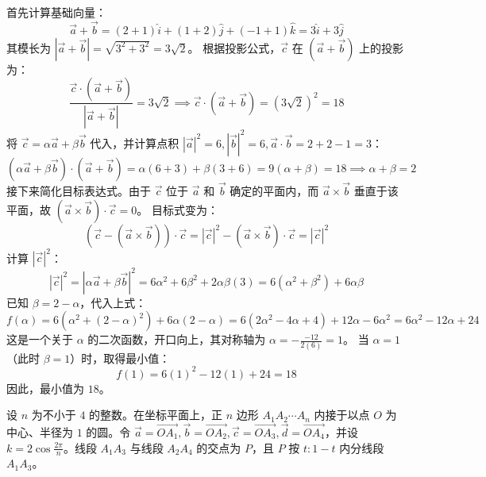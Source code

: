 \begin{questions}
\begin{solution}
首先计算基础向量：
\[
\vec{a} + \vec{b} = (2+1)\hat{i} + (1+2)\hat{j} + (-1+1)\hat{k} = 3\hat{i} + 3\hat{j}
\]
其模长为 $|\vec{a} + \vec{b}| = \sqrt{3^2 + 3^2} = 3\sqrt{2}$。
根据投影公式，$\vec{c}$ 在 $(\vec{a} + \vec{b})$ 上的投影为：
\[
\frac{\vec{c} \cdot (\vec{a} + \vec{b})}{|\vec{a} + \vec{b}|} = 3\sqrt{2} \implies \vec{c} \cdot (\vec{a} + \vec{b}) = (3\sqrt{2})^2 = 18
\]
将 $\vec{c} = \alpha\vec{a} + \beta\vec{b}$ 代入，并计算点积 $|\vec{a}|^2 = 6, |\vec{b}|^2 = 6, \vec{a} \cdot \vec{b} = 2+2-1 = 3$：
\[
(\alpha\vec{a} + \beta\vec{b}) \cdot (\vec{a} + \vec{b}) = \alpha(6+3) + \beta(3+6) = 9(\alpha + \beta) = 18 \implies \alpha + \beta = 2
\]
接下来简化目标表达式。由于 $\vec{c}$ 位于 $\vec{a}$ 和 $\vec{b}$ 确定的平面内，而 $\vec{a} \times \vec{b}$ 垂直于该平面，故 $(\vec{a} \times \vec{b}) \cdot \vec{c} = 0$。
目标式变为：
\[
(\vec{c} - (\vec{a} \times \vec{b})) \cdot \vec{c} = |\vec{c}|^2 - (\vec{a} \times \vec{b}) \cdot \vec{c} = |\vec{c}|^2
\]
计算 $|\vec{c}|^2$：
\[
|\vec{c}|^2 = |\alpha\vec{a} + \beta\vec{b}|^2 = 6\alpha^2 + 6\beta^2 + 2\alpha\beta(3) = 6(\alpha^2 + \beta^2) + 6\alpha\beta
\]
已知 $\beta = 2 - \alpha$，代入上式：
\[
f(\alpha) = 6(\alpha^2 + (2-\alpha)^2) + 6\alpha(2-\alpha) = 6(2\alpha^2 - 4\alpha + 4) + 12\alpha - 6\alpha^2 = 6\alpha^2 - 12\alpha + 24
\]
这是一个关于 $\alpha$ 的二次函数，开口向上，其对称轴为 $\alpha = -\frac{-12}{2(6)} = 1$。
当 $\alpha = 1$（此时 $\beta = 1$）时，取得最小值：
\[
f(1) = 6(1)^2 - 12(1) + 24 = 18
\]
因此，最小值为 $18$。
\end{solution}

\question
设 $n$ 为不小于 $4$ 的整数。在坐标平面上，正 $n$ 边形 $A_1A_2\cdots A_n$ 内接于以点 $O$ 为中心、半径为 $1$ 的圆。令 $\vec{a} = \overrightarrow{OA_1}, \vec{b} = \overrightarrow{OA_2}, \vec{c} = \overrightarrow{OA_3}, \vec{d} = \overrightarrow{OA_4}$，并设 $k = 2\cos \frac{2\pi}{n}$。线段 $A_1A_3$ 与线段 $A_2A_4$ 的交点为 $P$，且 $P$ 按 $t:1-t$ 内分线段 $A_1A_3$。
\end{questions}
